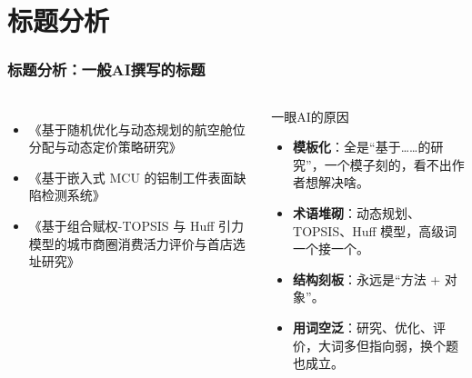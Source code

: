 \documentclass[aspectratio=169]{beamer}
\begin{document}
\section{标题分析}
\begin{frame}
	\frametitle{标题分析：一般AI撰写的标题}
	\small
	\begin{columns}[T]
		\setlength{\itemsep}{6pt}
		\begin{itemize}
			\item 《基于随机优化与动态规划的航空舱位分配与动态定价策略研究》
			\item 《基于嵌入式 MCU 的铝制工件表面缺陷检测系统》
			\item 《基于组合赋权-TOPSIS 与 Huff 引力模型的城市商圈消费活力评价与首店选址研究》
		\end{itemize}

		\begin{block}{一眼AI的原因}
			\begin{itemize}
				\item \textbf{模板化}：全是``基于……的研究''，一个模子刻的，看不出作者想解决啥。
				\item \textbf{术语堆砌}：动态规划、TOPSIS、Huff 模型，高级词一个接一个。
				\item \textbf{结构刻板}：永远是``方法 + 对象''。
				\item \textbf{用词空泛}：研究、优化、评价，大词多但指向弱，换个题也成立。
			\end{itemize}
		\end{block}
	\end{columns}

\end{frame}
\end{document}
